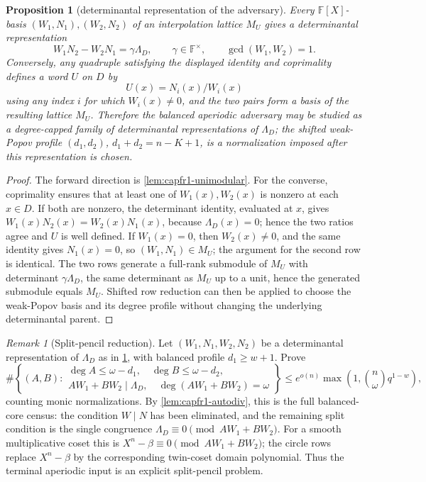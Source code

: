 \documentclass[11pt]{article}
\newtheorem{proposition}[proposition]{Proposition}
\theoremstyle{definition}
\theoremstyle{remark}
\newtheorem{remark}[remark]{Remark}
\newcommand{\F}{\mathbb{F}}
\begin{document}
\begin{proposition}[determinantal representation of the adversary]\label{prop:capfr1-detrep}
Every \(\F[X]\)-basis \((W_1,N_1),(W_2,N_2)\) of an interpolation lattice \(M_U\) gives a determinantal representation
\[
        W_1N_2-W_2N_1=\gamma\Lambda_D,
        \qquad
        \gamma\in\F^\times,
        \qquad
        \gcd(W_1,W_2)=1.
\]
Conversely, any quadruple satisfying the displayed identity and coprimality defines a word \(U\) on \(D\) by
\[
        U(x)=N_i(x)/W_i(x)
\]
using any index \(i\) for which \(W_i(x)\ne0\), and the two pairs form a basis of the resulting lattice \(M_U\).  Therefore the balanced aperiodic adversary may be studied as a degree-capped family of determinantal representations of \(\Lambda_D\); the shifted weak-Popov profile \((d_1,d_2)\), \(d_1+d_2=n-K+1\), is a normalization imposed after this representation is chosen.
\end{proposition}

\begin{proof}
The forward direction is \cref{lem:capfr1-unimodular}.  For the converse, coprimality ensures that at least one of \(W_1(x),W_2(x)\) is nonzero at each \(x\in D\).  If both are nonzero, the determinant identity, evaluated at \(x\), gives \(W_1(x)N_2(x)=W_2(x)N_1(x)\), because \(\Lambda_D(x)=0\); hence the two ratios agree and \(U\) is well defined.  If \(W_1(x)=0\), then \(W_2(x)\ne0\), and the same identity gives \(N_1(x)=0\), so \((W_1,N_1)\in M_U\); the argument for the second row is identical.  The two rows generate a full-rank submodule of \(M_U\) with determinant \(\gamma\Lambda_D\), the same determinant as \(M_U\) up to a unit, hence the generated submodule equals \(M_U\).  Shifted row reduction can then be applied to choose the weak-Popov basis and its degree profile without changing the underlying determinantal parent.
\end{proof}

\begin{remark}[Split-pencil reduction]\label{prob:capfr1-split-pencil}
Let \((W_1,N_1,W_2,N_2)\) be a determinantal representation of \(\Lambda_D\) as in \cref{prop:capfr1-detrep}, with balanced profile \(d_1\ge w+1\).  Prove
\[
        \#\left\{(A,B):\begin{array}{l}
        \deg A\le\omega-d_1,
        \quad \deg B\le\omega-d_2,\\
        AW_1+BW_2\mid\Lambda_D,
        \quad \deg(AW_1+BW_2)=\omega
        \end{array}\right\}
        \le
        e^{o(n)}\max\left(1,\binom n\omega q^{1-w}\right),
\]
counting monic normalizations.  By \cref{lem:capfr1-autodiv}, this is the full balanced-core census: the condition \(W\mid N\) has been eliminated, and the remaining split condition is the single congruence \(\Lambda_D\equiv0\pmod{AW_1+BW_2}\).  For a smooth multiplicative coset this is \(X^n-\beta\equiv0\pmod{AW_1+BW_2}\); the circle rows replace \(X^n-\beta\) by the corresponding twin-coset domain polynomial.  Thus the terminal aperiodic input is an explicit split-pencil problem.
\end{remark}
\end{document}
